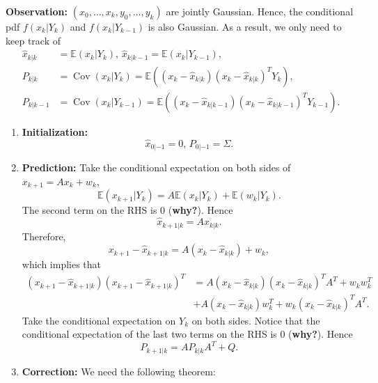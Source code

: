\documentclass{article}
\newcommand{\why}{({\bf why?})}
\DeclareMathOperator{\Cov}{Cov}
\begin{document}
{\bf Observation:} $(x_0,\dots,x_k,y_0,\dots,y_k)$ are jointly Gaussian. Hence, the conditional pdf $f(x_k|Y_k)$ and $f(x_k|Y_{k-1})$ is also Gaussian. As a result, we only need to keep track of 
\begin{align*}
  \hat x_{k|k} &= \mathbb E(x_k|Y_k),\, \hat x_{k|k-1} = \mathbb E(x_k|Y_{k-1}),\\
  P_{k|k} &= \Cov(x_k|Y_k) = \mathbb E\left( (x_k - \hat x_{k|k})(x_k - \hat x_{k|k})^TY_k \right),\\
  P_{k|k-1} &=  \Cov(x_k|Y_{k-1}) = \mathbb E\left( (x_k - \hat x_{k|k-1})(x_k - \hat x_{k|k-1})^TY_{k-1} \right).
\end{align*}

\begin{enumerate}
  \item {\bf Initialization:}
    \begin{equation}
      \hat x_{0|-1} = 0,\,P_{0|-1} = \Sigma. 
      \label{eq:init}
    \end{equation}
  \item {\bf Prediction:} Take the conditional expectation on both sides of $x_{k+1} = Ax_k + w_k$, 
    \begin{displaymath}
      \mathbb E(x_{k+1}|Y_k) = A \mathbb E(x_k|Y_k) + \mathbb E(w_k | Y_k). 
    \end{displaymath}
    The second term on the RHS is $0$ \why. Hence
    \begin{equation}
      \hat x_{k+1|k} = A \hat x_{k|k}. 
      \label{eq:predict1}
    \end{equation}
    Therefore,
    \begin{displaymath}
      x_{k+1}-\hat x_{k+1|k} = A(x_k- \hat x_{k|k}) + w_k,
    \end{displaymath}
    which implies that
    \begin{align*}
     (x_{k+1}-\hat x_{k+1|k})(x_{k+1}-\hat x_{k+1|k})^T &= A(x_k- \hat x_{k|k})(x_k- \hat x_{k|k})^TA^T + w_kw_k^T  \\
     &+ A(x_k- \hat x_{k|k}) w_k^T + w_k(x_k- \hat x_{k|k})^TA^T.
    \end{align*}
    Take the conditional expectation on $Y_{k}$ on both sides. Notice that the conditional expectation of the last two terms on the RHS is 0 \why. Hence
    \begin{equation}
      P_{k+1|k} = AP_{k|k}A^T + Q. 
      \label{eq:predict2}
    \end{equation}
  \item {\bf Correction:} We need the following theorem:

\end{enumerate}
\end{document}

